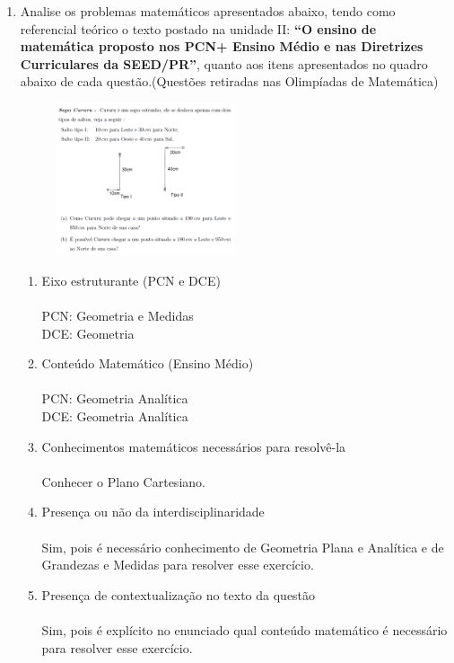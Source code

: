 \documentclass[a4paper, 12pt]{article}
\begin{document}
\begin{enumerate}
\item Analise os problemas matemáticos apresentados abaixo, tendo como referencial teórico o texto postado na unidade II: \textbf{“O ensino de matemática proposto nos PCN+ Ensino Médio e nas Diretrizes Curriculares da SEED/PR”}, quanto aos itens apresentados no quadro abaixo de cada questão.(Questões retiradas nas Olimpíadas de Matemática)
\begin{figure}[h!]
  \centering
  \includegraphics[width=0.5\textwidth]{1}
\end{figure} 
  \begin{enumerate}
  \item Eixo estruturante (PCN e DCE)\\\\
    PCN: Geometria e Medidas\\
    DCE: Geometria
  \item Conteúdo Matemático (Ensino Médio) \\\\
    PCN: Geometria Analítica\\
    DCE: Geometria Analítica
  \item Conhecimentos matemáticos necessários para resolvê-la \\\\
    Conhecer o Plano Cartesiano.
  \item Presença ou não da interdisciplinaridade \\\\
    Sim, pois é necessário conhecimento de Geometria Plana e Analítica e de Grandezas e Medidas para resolver esse exercício.
  \item Presença de contextualização no texto da questão\\\\
    Sim, pois é explícito no enunciado qual conteúdo matemático é necessário para resolver esse exercício.
  \end{enumerate}


\end{enumerate}
\end{document}
